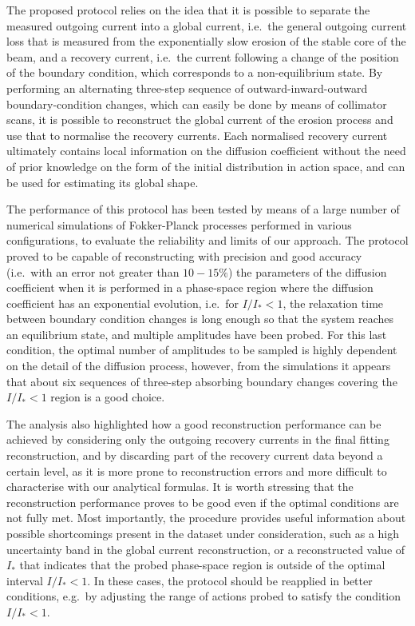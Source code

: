 The proposed protocol relies on the idea that it is possible to separate the measured outgoing current into a global current, i.e.\ the general outgoing current loss that is measured from the exponentially slow erosion of the stable core of the beam, and a recovery current, i.e.\ the current following a change of the position of the boundary condition, which corresponds to a non-equilibrium state. By performing an alternating three-step sequence of outward-inward-outward boundary-condition changes, which can easily be done by means of collimator scans, it is possible to reconstruct the global current of the erosion process and use that to normalise the recovery currents. Each normalised recovery current ultimately contains local information on the diffusion coefficient without the need of prior knowledge on the form of the initial distribution in action space, and can be used for estimating its global shape.

The performance of this protocol has been tested by means of a large number of numerical simulations of Fokker-Planck processes performed in various configurations, to evaluate the reliability and limits of our approach. The protocol proved to be capable of reconstructing with precision and good accuracy  {(i.e.\ with an error not greater than $10-15\%$)} the parameters of the diffusion coefficient when it is performed in a phase-space region where the diffusion coefficient has an exponential evolution, i.e.\ for $I/I_\ast < 1$, the relaxation time between boundary condition changes is long enough so that the system reaches an equilibrium state, and multiple amplitudes have been probed. For this last condition, the optimal number of amplitudes to be sampled is highly dependent on the detail of the diffusion process, however, from the simulations it appears that about six sequences of three-step absorbing boundary changes covering the $I / I_\ast < 1$ region is a good choice. 

The analysis also highlighted how a good reconstruction performance can be achieved by considering only the outgoing recovery currents in the final fitting reconstruction, and by discarding part of the recovery current data beyond a certain level, as it is more prone to reconstruction errors and more difficult to characterise with our analytical formulas. It is worth stressing that the reconstruction performance proves to be good even if the optimal conditions are not fully met. Most importantly, the procedure provides useful information about possible shortcomings present in the dataset under consideration, such as a high uncertainty band in the global current reconstruction, or a reconstructed value of $I_\ast$ that indicates that the probed phase-space region is outside of the optimal interval $I / I_\ast < 1$. In these cases, the protocol should be reapplied in better conditions, e.g.\ by adjusting the range of actions probed to satisfy the condition $I / I_\ast < 1$.

